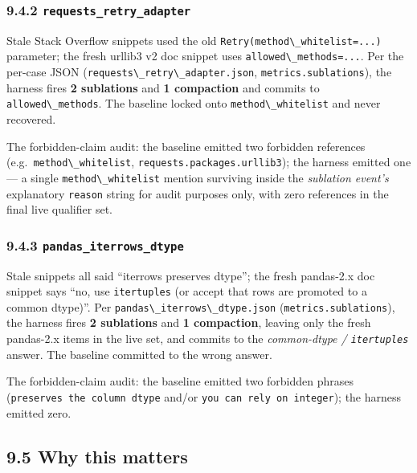 \subsubsection{\texorpdfstring{9.4.2 \texttt{requests\_retry\_adapter}}{9.4.2 requests\_retry\_adapter}}\label{requests_retry_adapter}

Stale Stack Overflow snippets used the old \passthrough{\lstinline!Retry(method\_whitelist=...)!} parameter; the fresh urllib3 v2 doc snippet uses \passthrough{\lstinline!allowed\_methods=...!}. Per the per-case JSON (\passthrough{\lstinline!requests\_retry\_adapter.json!}, \passthrough{\lstinline!metrics.sublations!}), the harness fires \textbf{2 sublations} and \textbf{1 compaction} and commits to \passthrough{\lstinline!allowed\_methods!}. The baseline locked onto \passthrough{\lstinline!method\_whitelist!} and never recovered.

The forbidden-claim audit: the baseline emitted two forbidden references (e.g.~\passthrough{\lstinline!method\_whitelist!}, \passthrough{\lstinline!requests.packages.urllib3!}); the harness emitted one --- a single \passthrough{\lstinline!method\_whitelist!} mention surviving inside the \emph{sublation event's} explanatory \passthrough{\lstinline!reason!} string for audit purposes only, with zero references in the final live qualifier set.

\subsubsection{\texorpdfstring{9.4.3 \texttt{pandas\_iterrows\_dtype}}{9.4.3 pandas\_iterrows\_dtype}}\label{pandas_iterrows_dtype}

Stale snippets all said ``iterrows preserves dtype''; the fresh pandas-2.x doc snippet says ``no, use \passthrough{\lstinline!itertuples!} (or accept that rows are promoted to a common dtype)''. Per \passthrough{\lstinline!pandas\_iterrows\_dtype.json!} (\passthrough{\lstinline!metrics.sublations!}), the harness fires \textbf{2 sublations} and \textbf{1 compaction}, leaving only the fresh pandas-2.x items in the live set, and commits to the \emph{common-dtype / \passthrough{\lstinline!itertuples!}} answer. The baseline committed to the wrong answer.

The forbidden-claim audit: the baseline emitted two forbidden phrases (\passthrough{\lstinline!preserves the column dtype!} and/or \passthrough{\lstinline!you can rely on integer!}); the harness emitted zero.

\subsection{9.5 Why this matters}\label{why-this-matters}


